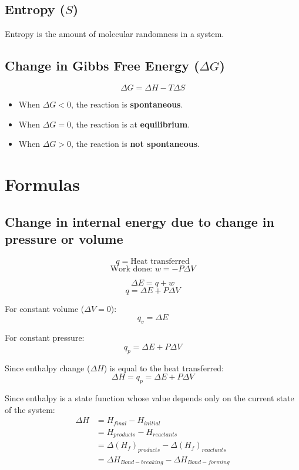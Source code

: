 \documentclass[11pt]{article}
\begin{document}
\subsection{Entropy (\(S\))}
\label{sec:org21d652e}
Entropy is the amount of molecular randomness in a system.

\subsection{Change in Gibbs Free Energy (\(\Delta G\))}
\label{sec:org3ed1fb2}
\[\Delta G = \Delta H - T \Delta S\]

\begin{itemize}
\item When \(\Delta G < 0\), the reaction is \textbf{spontaneous}.
\item When \(\Delta G = 0\), the reaction is at \textbf{equilibrium}.
\item When \(\Delta G > 0\), the reaction is \textbf{not spontaneous}.
\end{itemize}

\newpage

\section{Formulas}
\label{sec:org6a77c77}

\subsection{Change in internal energy due to change in pressure or volume}
\label{sec:org1d6d609}
\[q = \text{Heat transferred}\]
\[\text{Work done: } w = - P \Delta V\]

\[\Delta E = q + w\]
\[q = \Delta E + P \Delta V\]

For constant volume (\(\Delta V = 0\)):
\[q_v = \Delta E\]

For constant pressure:
\[q_p = \Delta E + P \Delta V\]

Since enthalpy change (\(\Delta H\)) is equal to the heat transferred:
\[\Delta H = q_p = \Delta E + P \Delta V\]

Since enthalpy is a state function whose value depends only on the current state of the system:
\begin{align*}
\Delta H &= H_{final} - H_{initial} \\
&= H_{products} - H_{reactants} \\
&= \Delta (H_f)_{products} - \Delta (H_f)_{reactants} \\
&= \Delta H_{Bond-breaking} - \Delta H_{Bond-forming}
\end{align*}
\end{document}
